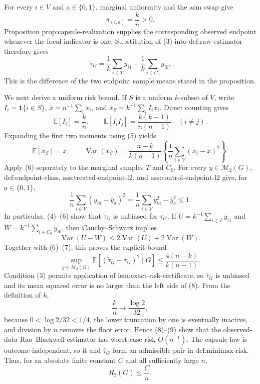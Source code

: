 For every \(i\in V\) and \(a\in\{0,1\}\), marginal uniformity and the arm swap give
\[
 \pi_{(i,a)}=\frac{k}{n}>0. \tag{3}
\]
Proposition \(\text{prop:capsule-realization}\) supplies the corresponding observed endpoint whenever the focal indicator is one.  Substitution of (3) into \(\text{def:raw-estimator}\) therefore gives
\[
 \widetilde\tau_G
 =\frac1k\sum_{i\in T}y_{i1}
  -\frac1k\sum_{i\in C_0}y_{i0}. \tag{4}
\]
This is the difference of the two endpoint sample means stated in the proposition.

We next derive a uniform risk bound.  If \(S\) is a uniform \(k\)-subset of \(V\), write \(I_i=\mathbf 1\{i\in S\}\), \(\bar x=n^{-1}\sum_i x_i\), and \(\bar x_S=k^{-1}\sum_i I_ix_i\).  Direct counting gives
\[
 \mathbb E[I_i]=\frac{k}{n},\qquad
 \mathbb E[I_iI_j]=\frac{k(k-1)}{n(n-1)}\quad(i\ne j). \tag{5}
\]
Expanding the first two moments using (5) yields
\[
 \mathbb E[\bar x_S]=\bar x,
 \qquad
 \operatorname{Var}(\bar x_S)
 =\frac{n-k}{k(n-1)}
   \left\{\frac1n\sum_{i\in V}(x_i-\bar x)^2\right\}. \tag{6}
\]
Apply (6) separately to the marginal samples \(T\) and \(C_0\).  For every \(y\in\mathcal M_2(G)\), \(\text{def:endpoint-class}\), \(\text{ass:treated-endpoint-l2}\), and \(\text{ass:control-endpoint-l2}\) give, for \(a\in\{0,1\}\),
\[
 \frac1n\sum_{i\in V}(y_{ia}-\bar y_a)^2
 =\frac1n\sum_{i\in V}y_{ia}^2-\bar y_a^2
 \le 1. \tag{7}
\]
In particular, (4)--(6) show that \(\widetilde\tau_G\) is unbiased for \(\tau_G\).  If \(U=k^{-1}\sum_{i\in T}y_{i1}\) and \(W=k^{-1}\sum_{i\in C_0}y_{i0}\), then Cauchy--Schwarz implies
\[
 \operatorname{Var}(U-W)
 \le 2\operatorname{Var}(U)+2\operatorname{Var}(W).
\]
Together with (6)--(7), this proves the explicit bound
\[
 \sup_{y\in\mathcal M_2(G)}
 \mathbb E[(\widetilde\tau_G-\tau_G)^2\mid G]
 \le \frac{4(n-k)}{k(n-1)}. \tag{8}
\]
Condition (3) permits application of \(\text{lem:exact-risk-certificate}\), so \(\widehat\tau_G\) is unbiased and its mean squared error is no larger than the left side of (8).  From the definition of \(k\),
\[
 \frac{k}{n}\longrightarrow\frac{\log 2}{32}, \tag{9}
\]
because \(0<\log 2/32<1/4\), the lower truncation by one is eventually inactive, and division by \(n\) removes the floor error.  Hence (8)--(9) show that the observed-data Rao--Blackwell estimator has worst-case risk \(O(n^{-1})\).  The capsule law is outcome-independent, so it and \(\widehat\tau_G\) form an admissible pair in \(\text{def:minimax-risk}\).  Thus, for an absolute finite constant \(C\) and all sufficiently large \(n\),
\[
 R_2(G)\le \frac Cn. \tag{10}
\]

